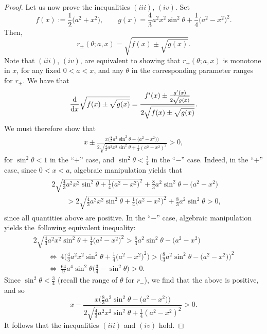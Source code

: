 \documentclass[10pt,a4paper]{amsart}
\numberwithin{equation}{section}
\begin{document}
\begin{proof}
Let us now prove the inequalities $(iii)$, $(iv)$. Set
\[
f(x) :=\frac{1}{2}\bigl(a^2+x^2\bigr), \qquad g(x) = \frac{4}{3}a^2x^2\sin^2\theta +\frac{1}{4}\bigl(a^2-x^2\bigr)^2.
\]
Then,
 \begin{equation*}
 r_{\pm}(\theta;a,x) = \sqrt{f(x) \pm \sqrt{g(x)}}.
 \end{equation*}
Note that $(iii)$, $(iv)$, are equivalent to showing that $r_{\pm}(\theta;a,x) $ is monotone in $x$, for any fixed $0< a < x$, and any $\theta$ in the corresponding parameter ranges for $r_{\pm}$.
We have that
 \begin{equation*}
 \frac{\rm d}{{\rm d}x} \sqrt{f(x) \pm \sqrt{g(x)}} =
 \frac{f'(x) \pm \frac{g'(x)}{2\sqrt{g(x)}}}{2\sqrt{f(x) \pm \sqrt{g(x)}}}.
 \end{equation*}
We must therefore show that
 \begin{align*}
 x \pm \frac{x\bigl(\frac{8}{3}a^2\sin^2\theta - \bigl(a^2-x^2\bigr)\bigr)}{2\sqrt{\frac{4}{3}a^2x^2\sin^2\theta + \frac{1}{4}(a^2-x^2)^2}} >0,
 \end{align*}
for $\sin^2\theta < 1$ in the ``$+$'' case, and $\sin^2\theta <\frac{3}{4}$ in the ``$-$'' case. Indeed, in the ``$+$'' case, since $0<x<a$,
algebraic manipulation yields that
 \begin{gather*}
\begin{split}
& 2\sqrt{\frac{4}{3}a^2x^2\sin^2\theta + \frac{1}{4}\bigl(a^2-x^2\bigr)^2} + \frac{8}{3}a^2\sin^2\theta - \bigl(a^2-x^2\bigr) \\
& \qquad{}> 2\sqrt{\frac{4}{3}a^2x^2\sin^2\theta + \frac{1}{4}\bigl(a^2-x^2\bigr)^2} + \frac{8}{3}a^2\sin^2\theta > 0,
\end{split}
 \end{gather*}
since all quantities above are positive. In the ``$-$'' case, algebraic manipulation yields the~following equivalent inequality:
 \begin{gather*}
 2\sqrt{\frac{4}{3}a^2x^2\sin^2\theta + \frac{1}{4}\bigl(a^2-x^2\bigr)^2}> \frac{8}{3}a^2\sin^2\theta - \bigl(a^2-x^2\bigr)\\
 \qquad{}\Longleftrightarrow \ 4\biggl(\frac{4}{3}a^2x^2\sin^2\theta + \frac{1}{4}\bigl(a^2-x^2\bigr)^2\biggr) > \biggl(\frac{8}{3}a^2\sin^2\theta - \bigl(a^2-x^2\bigr)\biggr)^2\\
 \qquad{}\Longleftrightarrow \ \frac{64}{9}a^4\sin^2\theta\biggl(\frac{3}{4}-\sin^2\theta\biggr) > 0.
 \end{gather*}
Since $\sin^2\theta <\frac{3}{4}$ (recall the range of $\theta$ for $r_-$), we find that the above is positive, and so{\samepage
 \begin{equation*}
 x - \frac{x\bigl(\frac{8}{3}a^2\sin^2\theta - \bigl(a^2-x^2\bigr)\bigr)}{2\sqrt{\frac{4}{3}a^2x^2\sin^2\theta + \frac{1}{4}(a^2-x^2)^2}} >0.
 \end{equation*}
It follows that the inequalities $(iii)$ and $(iv)$ hold.}


\end{proof}
\end{document}
